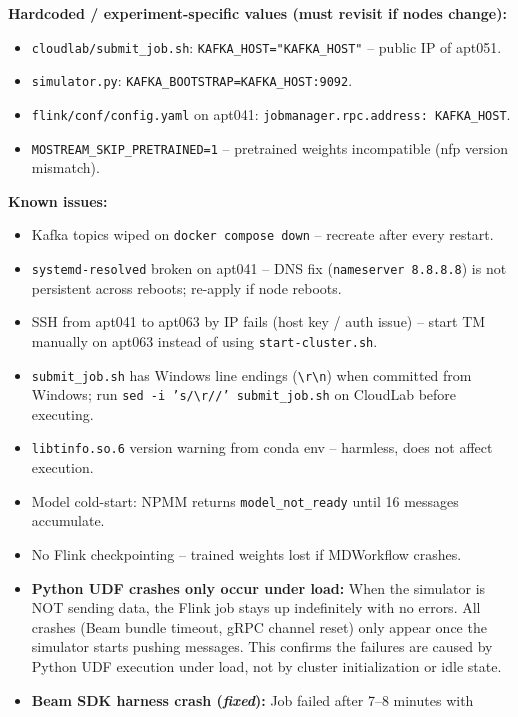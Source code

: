 \documentclass[11pt,a4paper]{article}
\begin{document}
\bigskip
\textbf{Hardcoded / experiment-specific values (must revisit if nodes change):}
\begin{itemize}
  \item \texttt{cloudlab/submit\_job.sh}: \texttt{KAFKA\_HOST="KAFKA_HOST"} -- public IP of apt051.
  \item \texttt{simulator.py}: \texttt{KAFKA\_BOOTSTRAP=KAFKA_HOST:9092}.
  \item \texttt{flink/conf/config.yaml} on apt041: \texttt{jobmanager.rpc.address: KAFKA_HOST}.
  \item \texttt{MOSTREAM\_SKIP\_PRETRAINED=1} -- pretrained weights incompatible (nfp version mismatch).
\end{itemize}

\bigskip
\textbf{Known issues:}
\begin{itemize}
  \item Kafka topics wiped on \texttt{docker compose down} -- recreate after every restart.
  \item \texttt{systemd-resolved} broken on apt041 -- DNS fix (\texttt{nameserver 8.8.8.8})
        is not persistent across reboots; re-apply if node reboots.
  \item SSH from apt041 to apt063 by IP fails (host key / auth issue) -- start TM manually
        on apt063 instead of using \texttt{start-cluster.sh}.
  \item \texttt{submit\_job.sh} has Windows line endings (\texttt{\textbackslash r\textbackslash n})
        when committed from Windows; run \texttt{sed -i 's/\textbackslash r//' submit\_job.sh}
        on CloudLab before executing.
  \item \texttt{libtinfo.so.6} version warning from conda env -- harmless, does not affect execution.
  \item Model cold-start: NPMM returns \texttt{model\_not\_ready} until 16 messages accumulate.
  \item No Flink checkpointing -- trained weights lost if MDWorkflow crashes.
  \item \textbf{Python UDF crashes only occur under load:}
        When the simulator is NOT sending data, the Flink job stays up indefinitely with no
        errors. All crashes (Beam bundle timeout, gRPC channel reset) only appear once the
        simulator starts pushing messages. This confirms the failures are caused by Python UDF
        execution under load, not by cluster initialization or idle state.
  \item \textbf{Beam SDK harness crash (\textit{fixed}):} Job failed after 7--8 minutes with

\end{itemize}
\end{document}
